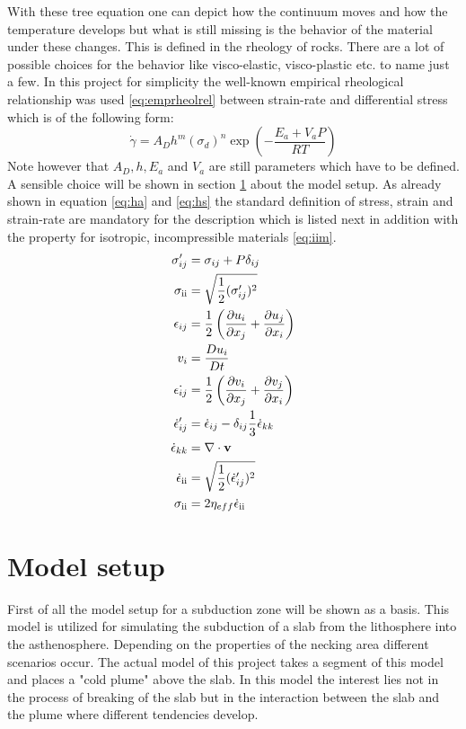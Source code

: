 \documentclass[12pt]{scrreprt}
\newcommand{\RN}[1]{%
  \textup{\uppercase\expandafter{\romannumeral#1}}%
}
\begin{document}
With these tree equation one can depict how the continuum moves and how the temperature develops but what is still missing is the behavior of the material under these changes. This is defined in the rheology of rocks. There are a lot of possible choices for the behavior like visco-elastic, visco-plastic etc. to name just a few. In this project for simplicity the well-known empirical rheological relationship was used \ref{eq:emprheolrel} between strain-rate and differential stress which is of the following form:
\begin{equation}
\dot{\gamma}=A_D h^m (\sigma_d)^n\exp\left( -\frac{E_a+V_a P}{RT} \right)
\label{eq:emprheolrel}
\end{equation}
Note however that $A_D,h,E_a$ and $V_a$ are still parameters which have to be defined. A sensible choice will be shown in section \ref{seq:modelsetup} about the model setup. As already shown in equation \ref{eq:ha} and \ref{eq:hs} the standard definition of stress, strain and strain-rate are mandatory for the description which is listed next in addition with the property for isotropic, incompressible materials \ref{eq:iim}.
\begin{align}
\sigma_{ij}'&=\sigma_{ij}+P\delta_{ij}\\
\sigma_{\RN{2}}&=\sqrt{\frac{1}{2}(\sigma_{ij}')^2}\\
\epsilon_{ij}&=\frac{1}{2}\left( \frac{\partial u_i}{\partial x_j}+\frac{\partial u_j}{\partial x_i}\right)\\
v_i&=\frac{D u_i}{D t}\\
\dot{\epsilon_{ij}}&=\frac{1}{2}\left( \frac{\partial v_i}{\partial x_j}+\frac{\partial v_j}{\partial x_i}\right)\\
\dot{\epsilon}_{ij}'&=\dot{\epsilon}_{ij}-\delta_{ij}\frac{1}{3}\dot{\epsilon}_{kk}\\
\dot{\epsilon}_{kk}&=\nabla \cdot \mathbf{v}\\
\dot{\epsilon}_{\RN{2}}&=\sqrt{\frac{1}{2}(\dot{\epsilon}_{ij}')^2}\\
\sigma_{\RN{2}} &= 2 \eta_{eff}\dot{\epsilon}_{\RN{2}}\label{eq:iim}
\end{align}

\section{Model setup}
\label{seq:modelsetup}
First of all the model setup for a subduction zone will be shown as a basis. This model is utilized for simulating the subduction of a slab from the lithosphere into the asthenosphere. Depending on the properties of the necking area different scenarios occur. The actual model of this project takes a segment of this model and places a "cold plume" above the slab. In this model the interest lies not in the process of breaking of the slab but in the interaction between the slab and the plume where different tendencies develop.
\end{document}
